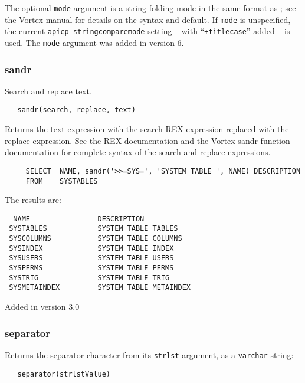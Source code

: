   The optional \verb`mode` argument is a string-folding mode in the
same format as {\tt <apicp stringcomparemode>}; see the Vortex manual
for details on the syntax and default.  If \verb`mode` is unspecified,
the current {\tt apicp stringcomparemode} setting -- with ``{\tt +titlecase}''
added -- is used.  The \verb`mode` argument was added in version 6.

\subsubsection{sandr}

Search and replace text.
\begin{verbatim}
   sandr(search, replace, text)
\end{verbatim}

Returns the text expression with the search REX expression replaced
with the replace expression.  See the REX documentation and the
Vortex sandr function documentation for complete syntax of the search
and replace expressions.

\begin{verbatim}
     SELECT  NAME, sandr('>>=SYS=', 'SYSTEM TABLE ', NAME) DESCRIPTION
     FROM    SYSTABLES
\end{verbatim}

The results are:

\begin{screen}
\begin{verbatim}
  NAME                DESCRIPTION
 SYSTABLES            SYSTEM TABLE TABLES
 SYSCOLUMNS           SYSTEM TABLE COLUMNS
 SYSINDEX             SYSTEM TABLE INDEX
 SYSUSERS             SYSTEM TABLE USERS
 SYSPERMS             SYSTEM TABLE PERMS
 SYSTRIG              SYSTEM TABLE TRIG
 SYSMETAINDEX         SYSTEM TABLE METAINDEX
\end{verbatim}
\end{screen}

Added in version 3.0

\subsubsection{separator}

Returns the separator character from its \verb`strlst` argument,
as a \verb`varchar` string:

\begin{verbatim}
   separator(strlstValue)
\end{verbatim}

